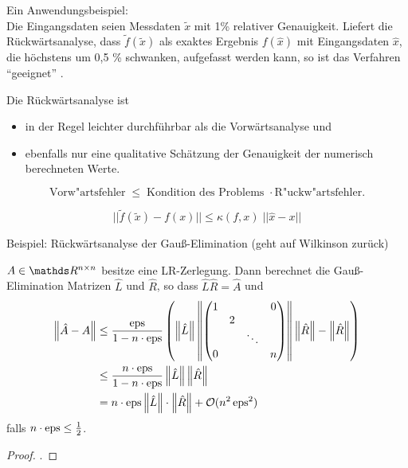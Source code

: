 Ein Anwendungsbeispiel:\\
Die Eingangsdaten seien Messdaten $\tilde{x}$  mit 1\% relativer Genauigkeit. 
Liefert die Rückwärtsanalyse, dass $\tilde{f} (\tilde{x})$ als exaktes Ergebnis 
$f(\hat x)$ mit Eingangsdaten $\hat x$, 
die höchstens um 0,5 \% schwanken, aufgefasst werden kann,
so ist das Verfahren \enquote{geeignet} . 

Die Rückwärtsanalyse ist
\begin{itemize}
\item in der Regel leichter durchführbar als die
  Vorwärtsanalyse  und 
\item ebenfalls nur eine qualitative Schätzung der
  Genauigkeit der numerisch berechneten Werte.
\end{itemize}

\begin{Beme}
  $$ \mbox{Vorw"artsfehler} \; \leq \; \mbox{Kondition des
    Problems } \cdot \mbox{R"uckw"artsfehler} .$$
  
  $$ ||\tilde f (\tilde x)  - f(x)|| \leq \kappa (f,x) \; || \hat x -x|| $$
  
  Beispiel: Rückwärtsanalyse der Gauß-Elimination
  (geht auf Wilkinson zurück)
\end{Beme}


\begin{Satze}
  $A \in \R^{n\times n}$ besitze eine LR-Zerlegung. Dann berechnet die
  Gauß-Elimination Matrizen $\hat{L}$ und $\hat{R}$,
  so dass $\hat{L}\hat{R} =\hat{A}$
  und
  \begin{align*}
     \nn[\hat{A}-A] 
     & \leq 
       \frac{\Eps}{1-n \cdot \Eps}
       \left( \nn[\hat{L}]
       \nn[{\begin{pmatrix}
         1 && & 0\\
         &2\\
         &&\ddots \\
         0&&& n\\
       \end{pmatrix}}]
    \nn[\hat{R}]-\nn[\hat{R}]
     \right)\\
    & \leq  \frac{n\cdot \Eps}{1-n\cdot \Eps}\nn[\hat{L}]\nn[\hat{R}] \\
    & = n\cdot \Eps \nn[\hat{L}]\cdot \nn[\hat{R}] 
      + \mathcal{O}( n^2 \Eps^2)
  \end{align*}
  falls $n\cdot \Eps \leq \frac{1}{2}$.
\end{Satze}
\begin{proof}
  \cite[siehe][]{stoerbulirsch}.
\end{proof}


